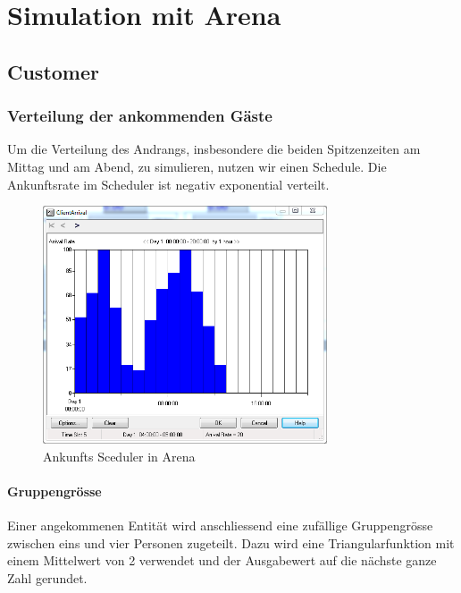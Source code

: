 \documentclass[ngerman,a4paper,12pt]{scrreprt}
\begin{document}
\chapter{Simulation mit Arena}
	\section{Customer}			
		\subsection{Verteilung der ankommenden Gäste}
			Um die Verteilung des Andrangs, insbesondere die beiden Spitzenzeiten am Mittag und am Abend, zu simulieren, nutzen wir einen Schedule. Die Ankunftsrate im Scheduler ist negativ exponential verteilt.
	
			\begin{figure}[H]
				\centering
					\includegraphics[trim=0.35cm 1.75cm 1cm 1.75cm, clip=true,width=0.75\textwidth]{img/scheduler.png}
					\caption[Arrival Sceduler in Arena]{Ankunfts Sceduler in Arena}
					\label{arrivalSceduler}
			\end{figure}
	
			\subsubsection{Gruppengrösse}
			Einer angekommenen Entität wird anschliessend eine zufällige Gruppengrösse zwischen eins und vier Personen zugeteilt. Dazu wird eine Triangularfunktion mit einem Mittelwert von 2 verwendet und der Ausgabewert auf die nächste ganze Zahl gerundet.
			
	
\end{document}
